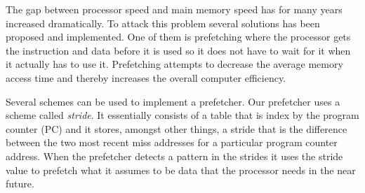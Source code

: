 The gap between processor speed and main memory speed has for many years increased dramatically. To
attack this problem several solutions has been proposed and implemented. One of them is prefetching
where the processor gets the instruction and data before it is used so it does not have to wait for
it when it actually has to use it. Prefetching attempts to decrease the average memory access time
and thereby increases the overall computer efficiency.

Several schemes can be used to implement a prefetcher. Our prefetcher uses a scheme called
\emph{stride}. It essentially consists of a table that is index by the program counter (PC) and it
stores, amongst other things, a stride that is the difference between the two most recent miss
addresses for a particular program counter address. When the prefetcher detects a pattern in the
strides it uses the stride value to prefetch what it assumes to be data that the processor needs in
the near future.

